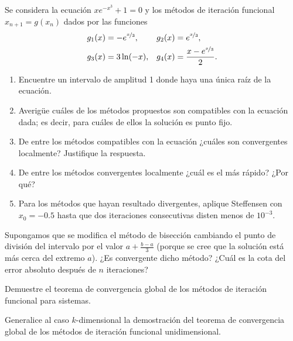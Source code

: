 \begin{ejercicio}\label{ej:1.13}
    Se considera la ecuación $xe^{-x^3} + 1 = 0$ y los métodos de iteración funcional $x_{n+1} = g(x_n)$ dados por las funciones
    \begin{align*}
        g_1(x) &= -e^{\nicefrac{x}{3}}, & g_2(x) &= e^{\nicefrac{x}{3}}, \\
        g_3(x) &= 3\ln(-x), & g_4(x) &= \dfrac{x-e^{\nicefrac{x}{3}}}{2}.
    \end{align*}
    \begin{enumerate}
        \item Encuentre un intervalo de amplitud 1 donde haya una única raíz de la ecuación.
        \item Averigüe cuáles de los métodos propuestos son compatibles con la ecuación dada; es decir, para cuáles de ellos la solución es punto fijo.
        \item De entre los métodos compatibles con la ecuación ¿cuáles son convergentes localmente? Justifique la respuesta.
        \item De entre los métodos convergentes localmente ¿cuál es el más rápido? ¿Por qué?
        \item Para los métodos que hayan resultado divergentes, aplique Steffensen con $x_0 = -0.5$ hasta que dos iteraciones consecutivas disten menos de $10^{-3}$.
    \end{enumerate}
\end{ejercicio}


\begin{ejercicio}\label{ej:1.14}
    Supongamos que se modifica el método de bisección cambiando el punto de división del intervalo por el valor $a + \frac{b-a}{3}$ (porque se cree que la solución está más cerca del extremo $a$). ¿Es convergente dicho método? ¿Cuál es la cota del error absoluto después de $n$ iteraciones?
\end{ejercicio}

\begin{ejercicio}\label{ej:1.15}
    Demuestre el teorema de convergencia global de los métodos de iteración funcional para sistemas.
    \begin{observacion}
        Generalice al caso $k$-dimensional la demostración del teorema de convergencia global de los métodos de iteración funcional unidimensional.
    \end{observacion}
\end{ejercicio}

